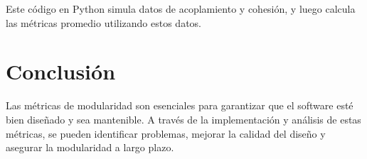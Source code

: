 \documentclass[a4,10pt]{article}
\begin{document}
Este código en Python simula datos de acoplamiento y cohesión, y luego calcula las métricas promedio utilizando estos datos.

\section{Conclusión}
Las métricas de modularidad son esenciales para garantizar que el software esté bien diseñado y sea mantenible. A través de la implementación y análisis de estas métricas, se pueden identificar problemas, mejorar la calidad del diseño y asegurar la modularidad a largo plazo.

\printbibliography
\end{document}
